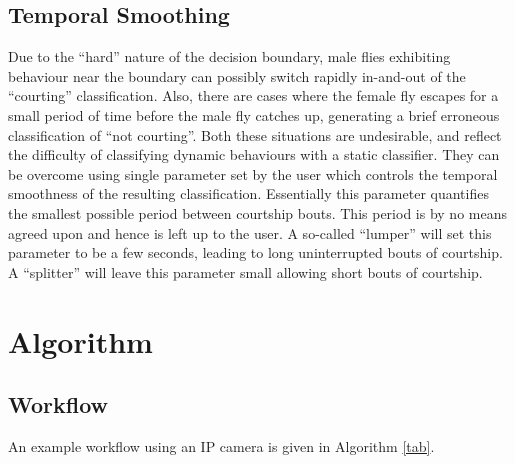 \documentclass{article}
\begin{document}
\subsection{Temporal Smoothing}

Due to the ``hard'' nature of the decision boundary, male flies exhibiting behaviour near the boundary can possibly switch rapidly in-and-out of the ``courting'' classification. Also, there are cases where the female fly escapes for a small period of time before the male fly catches up, generating a brief erroneous classification of ``not courting''. Both these situations are undesirable, and reflect the difficulty of classifying dynamic behaviours with a static classifier. They can be overcome using single parameter set by the user which controls the temporal smoothness of the resulting classification. Essentially this parameter quantifies the smallest possible period between courtship bouts. This period is by no means agreed upon and hence is left up to the user. A so-called ``lumper'' will set this parameter to be a few seconds, leading to long uninterrupted bouts of courtship. A ``splitter'' will leave this parameter small allowing short bouts of courtship.

\section{Algorithm}
\label{sec:algorithm}

\subsection{Workflow}

An example workflow using an IP camera is given in Algorithm \ref{tab}.
\end{document}
